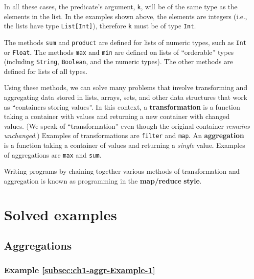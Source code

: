 In all these cases, the predicate\textsf{'}s argument, \lstinline!k!, will
be of the same type as the elements in the list. In the examples shown
above, the elements are integers (i.e., the lists have type \lstinline!List[Int]!),
therefore \texttt{}\lstinline!k! must be of type \lstinline!Int!.

The methods \lstinline!sum! and \texttt{}\lstinline!product! are
defined for lists of numeric types, such as \lstinline!Int! or \lstinline!Float!.
The methods \lstinline!max! and \lstinline!min! are defined on lists
of \textsf{``}orderable\textsf{''} types (including \lstinline!String!, \lstinline!Boolean!,
and the numeric types). The other methods are defined for lists of
all types.

Using these methods, we can solve many problems that involve transforming
and aggregating data stored in lists, arrays, sets, and other data
structures that work as \textsf{``}containers storing values\textsf{''}. In this context,
a \textbf{transformation} is a function
taking a container with values and returning a new container with
changed values. (We speak of \textsf{``}transformation\textsf{''} even though the
original container \emph{remains unchanged}.) Examples of transformations
are \texttt{}\lstinline!filter! and \lstinline!map!. An \textbf{aggregation}
is a function taking a container of values and returning a \emph{single}
value. Examples of aggregations are \texttt{}\lstinline!max! and
\lstinline!sum!.

Writing programs by chaining together various methods of transformation
and aggregation is known as programming in the \textbf{map/reduce}
\textbf{style}.

\section{Solved examples}

\subsection{Aggregations\label{subsec:Aggregation-solved-examples}}

\subsubsection{Example \label{subsec:ch1-aggr-Example-1}\ref{subsec:ch1-aggr-Example-1}}

